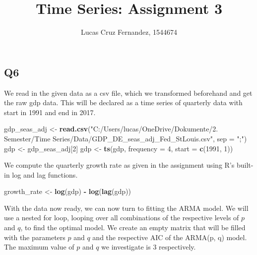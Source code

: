 \documentclass[]{article}
\title{Time Series: Assignment 3}
\author{Lucas Cruz Fernandez, 1544674}
\date{}
\newenvironment{Shaded}{\begin{snugshade}}{\end{snugshade}}
\newcommand{\DataTypeTok}[1]{\textcolor[rgb]{0.13,0.29,0.53}{#1}}
\newcommand{\DecValTok}[1]{\textcolor[rgb]{0.00,0.00,0.81}{#1}}
\newcommand{\KeywordTok}[1]{\textcolor[rgb]{0.13,0.29,0.53}{\textbf{#1}}}
\newcommand{\NormalTok}[1]{#1}
\newcommand{\OperatorTok}[1]{\textcolor[rgb]{0.81,0.36,0.00}{\textbf{#1}}}
\newcommand{\StringTok}[1]{\textcolor[rgb]{0.31,0.60,0.02}{#1}}
\begin{document}
\maketitle

\hypertarget{q6}{%
\subsection{Q6}\label{q6}}

We read in the given data as a csv file, which we transformed beforehand
and get the raw gdp data. This will be declared as a time series of
quarterly data with start in 1991 and end in 2017.

\begin{Shaded}
\begin{Highlighting}[]
\NormalTok{gdp_seas_adj <-}\StringTok{ }\KeywordTok{read.csv}\NormalTok{(}\StringTok{"C:/Users/lucas/OneDrive/Dokumente/2. Semester/Time Series/Data/GDP_DE_seas_adj_Fed_StLouis.csv"}\NormalTok{, }\DataTypeTok{sep =} \StringTok{";"}\NormalTok{)}
\NormalTok{gdp <-}\StringTok{ }\NormalTok{gdp_seas_adj[}\DecValTok{2}\NormalTok{]}
\NormalTok{gdp <-}\StringTok{ }\KeywordTok{ts}\NormalTok{(gdp, }\DataTypeTok{frequency =} \DecValTok{4}\NormalTok{, }\DataTypeTok{start =} \KeywordTok{c}\NormalTok{(}\DecValTok{1991}\NormalTok{, }\DecValTok{1}\NormalTok{))}
\end{Highlighting}
\end{Shaded}

We compute the quarterly growth rate as given in the assignment using
R's built-in log and lag functions.

\begin{Shaded}
\begin{Highlighting}[]
\NormalTok{growth_rate <-}\StringTok{ }\KeywordTok{log}\NormalTok{(gdp) }\OperatorTok{-}\StringTok{ }\KeywordTok{log}\NormalTok{(}\KeywordTok{lag}\NormalTok{(gdp))}
\end{Highlighting}
\end{Shaded}

With the data now ready, we can now turn to fitting the ARMA model. We
will use a nested for loop, looping over all combinations of the
respective levels of \(p\) and \(q\), to find the optimal model. We
create an empty matrix that will be filled with the parameters \(p\) and
\(q\) and the respective AIC of the ARMA(p, q) model. The maximum value
of \(p\) and \(q\) we investigate is 3 respectively.
\end{document}
